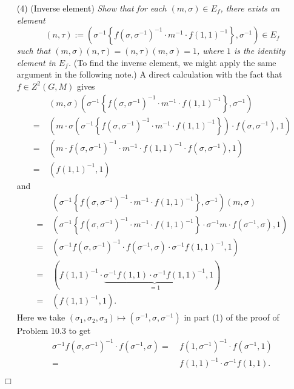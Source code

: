 \documentclass{article}
\begin{document}
\begin{enumerate}
\item[(4)]
  (Inverse element)
  \emph{Show that for each $(m,\sigma) \in E_f$,
  there exists an element
  \[
    (n,\tau)
    :=
    \left(\sigma^{-1}\left\{f(\sigma,\sigma^{-1})^{-1} \cdot m^{-1} \cdot f(1,1)^{-1}\right\}, \sigma^{-1} \right)
    \in E_f
  \]
  such that
  $(m,\sigma)(n,\tau) = (n,\tau)(m,\sigma) = 1$, where $1$ is the identity element in $E_f$.}
  (To find the inverse element, we might apply the same argument in the following note.)
  A direct calculation with the fact that $f \in Z^2(G,M)$ gives
  \begin{align*}
    & \:
    (m,\sigma)
    \left(\sigma^{-1}\left\{f(\sigma,\sigma^{-1})^{-1} \cdot m^{-1} \cdot f(1,1)^{-1}\right\}, \sigma^{-1} \right) \\
    = & \:
    (m \cdot \sigma\left(\sigma^{-1}\left\{f(\sigma,\sigma^{-1})^{-1} \cdot m^{-1} \cdot f(1,1)^{-1}\right\}\right)
        \cdot f(\sigma, \sigma^{-1}), 1) \\
    = & \:
    (m \cdot f(\sigma,\sigma^{-1})^{-1} \cdot m^{-1} \cdot f(1,1)^{-1}
        \cdot f(\sigma, \sigma^{-1}), 1) \\
    = & \:
    (f(1,1)^{-1}, 1)
  \end{align*}
  and
  \begin{align*}
    & \:
    \left(\sigma^{-1}\left\{f(\sigma,\sigma^{-1})^{-1} \cdot m^{-1} \cdot f(1,1)^{-1}\right\}, \sigma^{-1} \right)
    (m,\sigma) \\
    = & \:
    (\sigma^{-1}\left\{f(\sigma,\sigma^{-1})^{-1} \cdot m^{-1} \cdot f(1,1)^{-1}\right\}
        \cdot \sigma^{-1} m \cdot f(\sigma^{-1}, \sigma), 1) \\
    = & \:
    (\sigma^{-1} f(\sigma,\sigma^{-1})^{-1}
        \cdot f(\sigma^{-1}, \sigma) \cdot \sigma^{-1} f(1,1)^{-1}, 1) \\
    = & \:
    (f(1,1)^{-1} \cdot \underbrace{\sigma^{-1} f(1,1) \cdot \sigma^{-1} f(1,1)^{-1}}_{= 1}, 1) \\
    = & \:
    (f(1,1)^{-1}, 1).
  \end{align*}
  Here we take $(\sigma_1, \sigma_2, \sigma_3) \mapsto (\sigma^{-1}, \sigma, \sigma^{-1})$
  in part (1) of the proof of Problem 10.3 to get
  \begin{align*}
    \sigma^{-1} f(\sigma,\sigma^{-1})^{-1} \cdot f(\sigma^{-1}, \sigma)
    = & \:
    f(1,\sigma^{-1})^{-1} \cdot f(\sigma^{-1},1) \\
    = & \:
    f(1,1)^{-1} \cdot \sigma^{-1} f(1,1).
  \end{align*}
\end{enumerate}
$\Box$ \\
\end{document}
